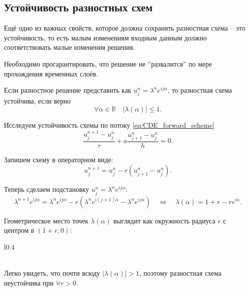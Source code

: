 \documentclass{article}
\begin{document}
\subsection{Устойчивость разностных схем}
Ещё одно из важных свойств, которое должна сохранять разностная схема -- это
устойчивость, то есть малым изменениям входным данным должно соответствовать
малые изменения решения.

Необходимо прогарантировать, что решение не ''развалится'' по мере прохождения
временных слоёв.

\begin{theorem}
	Если разностное решение представить как $u_j^n=\lambda^ne^{ij\alpha}$,
	то разностная схема устойчива, если верно
	\[\forall\alpha\in\mathbb R\quad|\lambda(\alpha)|\le 1.\]
\end{theorem}

\begin{example}
	Исследуем устойчивость схемы по потоку \eqref{eq:CDE_forward_scheme}
	\[\frac{u_j^{n+1}-u_j^n}{\tau}+a\frac{u_{j+1}^n-u_j^n}{h}=0.\]

	Запишем схему в операторном виде:
	\[u_j^{n+1}=u_j^n-r(u_{j+1}^n-u_j^n).\]

	Теперь сделаем подстановку $u_j^n=\lambda^ne^{ij\alpha}$:
	\[\lambda^{n+1}e^{ij\alpha}=\lambda^ne^{ij\alpha}-r(\lambda^n
	e^{i(j+1)\alpha}-\lambda^ne^{ij\alpha})\quad\Leftrightarrow\quad
	\lambda(\alpha)=1+r-re^{i\alpha}.\]

	Геометрическое место точек $\lambda(\alpha)$ выглядит как окружность
	радиуса $r$ с центром в $(1+r,0)$:

	{\makeatletter
	\let\par\@@par
	\par{}
	\everypar{}

	\begin{wrapfigure}{l}{0.4\textwidth}
		
	\end{wrapfigure}

	\leavevmode\\
	Легко увидеть, что почти всюду $|\lambda(\alpha)|>1$, поэтому
	разностная схема неустойчива при $\forall r>0$.
	\par}
\end{example}
\end{document}
